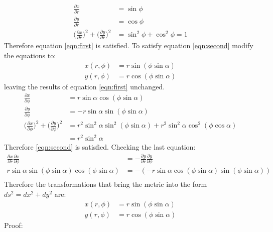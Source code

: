\documentclass[9pt]{report}
\begin{document}
\begin{enumerate}
\begin{enumerate}
\[\begin{align}
            \frac{\partial x}{\partial r} &= \sin\phi \\
            \frac{\partial y}{\partial r} &= \cos\phi \\
            \Big(\frac{\partial x}{\partial r}\Big)^2 + \Big(\frac{\partial y}{\partial r}\Big)^2 &= \sin^2\phi + \cos^2\phi = 1
          \end{align}
        \]
        Therefore equation \ref{eqn:first} is satisfied. To satisfy equation
        \ref{eqn:second} modify the equations to:
        \[
          \begin{align}
            x(r, \phi) &= r\sin(\phi\sin\alpha) \\
            y(r, \phi) &= r\cos(\phi\sin\alpha)
          \end{align}
        \]
        leaving the results of equation \ref{eqn:first} unchanged.
        \[
          \begin{align}
            \frac{\partial x}{\partial \phi} &= r\sin\alpha \cos(\phi\sin\alpha) \\
            \frac{\partial y}{\partial \phi} &= -r\sin\alpha \sin(\phi\sin\alpha) \\
            \Big(\frac{\partial x}{\partial \phi}\Big)^2 + \Big(\frac{\partial y}{\partial \phi}\Big)^2 &= r^2\sin^2\alpha\sin^2(\phi\sin\alpha) + r^2\sin^2\alpha\cos^2(\phi\cos\alpha)\\
                                                                                                        &= r^2\sin^2\alpha
          \end{align}
        \]
        Therefore \ref{eqn:second} is satisfied. Checking the last equation:
        \[
          \begin{align}
            \frac{\partial x}{\partial r}\frac{\partial x}{\partial \phi} &= -\frac{\partial y}{\partial r}\frac{\partial y}{\partial \phi} \\
            r\sin\alpha \sin(\phi\sin\alpha) \cos(\phi\sin\alpha) &= - (-r\sin\alpha \cos(\phi\sin\alpha) \sin(\phi\sin\alpha)) \\
          \end{align}
        \]
        Therefore the transformations that bring the metric into the form
        $ds^2 = dx^2 + dy^2$ are:
        \[
          \begin{align}
            x(r, \phi) &= r\sin(\phi\sin\alpha) \\
            y(r, \phi) &= r\cos(\phi\sin\alpha)
          \end{align}
        \]
        Proof:

\end{enumerate}
\end{enumerate}
\end{document}
